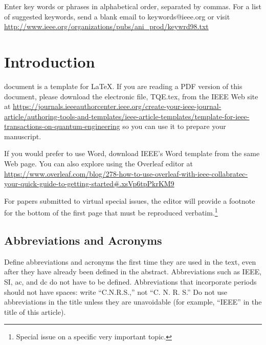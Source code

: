 \documentclass{ieeeaccess}
\begin{document}
\begin{keywords}
    Enter key words or phrases in alphabetical
    order, separated by commas. For a list of suggested keywords, send a blank
    email to keywords@ieee.org or visit \underline
    {http://www.ieee.org/organizations/pubs/ani\_prod/keywrd98.txt}
\end{keywords}

\titlepgskip=-15pt

\maketitle

\section{Introduction}
\label{sec:introduction}
 document is a template for \LaTeX. If you are
reading a PDF version of this document, please download the
electronic file, TQE.tex, from the IEEE Web site at \underline
{https://journals.ieeeauthorcenter.ieee.org/}\break\underline{create-your-ieee-journal-article/authoring-tools-and-}\break\underline{templates/ieee-article-templates/template-for-ieee-}\break\underline{transactions-on-quantum-engineering} so you can use it to prepare your manuscript.

If you would prefer to use Word, download IEEE's Word template
from the same Web page. You can also explore using the Overleaf editor at
\underline
{https://www.overleaf.com/blog/278-}\break\underline{how-to-use-overleaf-with-ieee-collabratec-your-quick-guide-}\break\underline{to-getting-started\#.xsVp6tpPkrKM9}

For papers submitted to virtual special issues, the editor will provide a footnote for the bottom of the first page that
must be reproduced verbatim.\footnote{Special issue on a specific very important topic.}

\subsection{Abbreviations and Acronyms}
Define abbreviations and acronyms the first time they are used in the text,
even after they have already been defined in the abstract. Abbreviations
such as IEEE, SI, ac, and dc do not have to be defined. Abbreviations that
incorporate periods should not have spaces: write ``C.N.R.S.,'' not ``C. N.
R. S.'' Do not use abbreviations in the title unless they are unavoidable
(for example, ``IEEE'' in the title of this article).
\end{document}
